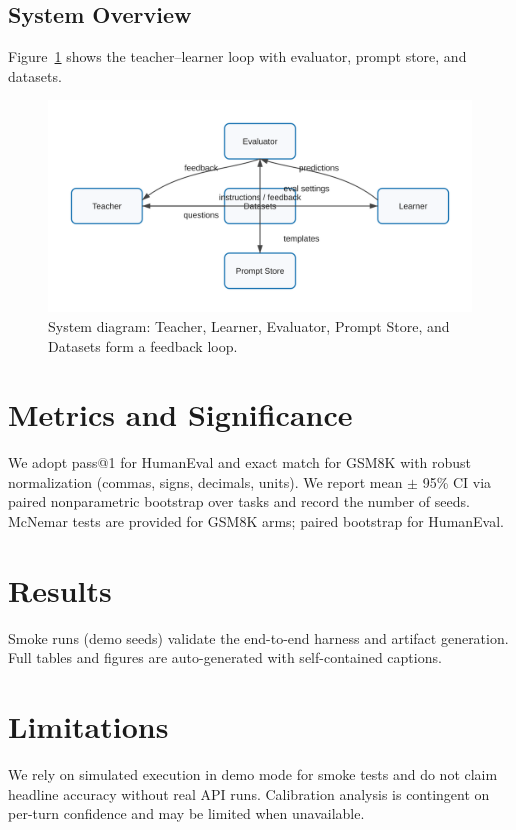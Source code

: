 \documentclass[11pt]{article}
\begin{document}
\subsection{System Overview}
Figure~\ref{fig:system} shows the teacher--learner loop with evaluator, prompt store, and datasets.
\begin{figure}[t]
  \centering
  \includegraphics[width=0.95\linewidth]{../reports/figures/system_diagram.svg}
  \caption{System diagram: Teacher, Learner, Evaluator, Prompt Store, and Datasets form a feedback loop.}
  \label{fig:system}
\end{figure}

\section{Metrics and Significance}
We adopt pass@1 for HumanEval and exact match for GSM8K with robust normalization (commas, signs, decimals, units). We report mean $\pm$ 95\% CI via paired nonparametric bootstrap over tasks and record the number of seeds. McNemar tests are provided for GSM8K arms; paired bootstrap for HumanEval.

\section{Results}
Smoke runs (demo seeds) validate the end-to-end harness and artifact generation. Full tables and figures are auto-generated with self-contained captions.

\section{Limitations}
We rely on simulated execution in demo mode for smoke tests and do not claim headline accuracy without real API runs. Calibration analysis is contingent on per-turn confidence and may be limited when unavailable.
\end{document}
